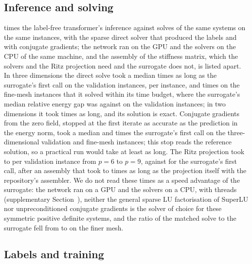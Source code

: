 \subsection{Inference and solving}\label{sec:cost:inference}



 times the label-free transformer's inference against solves of the same
systems on the same instances, with the sparse direct solver that produced the labels and
with conjugate gradients; the network ran on the GPU and the solvers on the CPU of the same
machine, and the assembly of the stiffness matrix, which the solvers and the Ritz projection
need and the surrogate does not, is listed apart. In three dimensions the direct solve took
a median \numCostThreeValDirectRatio{} times as long as the surrogate's first call on the
validation instances, per instance, and \numCostThreeFineDirectRatio{} times on the
\numCostFineDirectSolved{} fine-mesh instances that it solved within its time budget, where
the surrogate's median relative energy gap was \numCostThreeFineGap{} against
\numCostThreeValGap{} on the validation instances; in two dimensions it took
\numCostTwoDirectRatio{} times as long, and its solution is exact. Conjugate gradients from
the zero field, stopped at the first iterate as accurate as the prediction in the energy
norm, took a median \numCostThreeValMatchRatio{} and \numCostThreeFineMatchRatio{} times the
surrogate's first call on the three-dimensional validation and fine-mesh instances; this
stop reads the reference solution, so a practical run would take at least as long. The Ritz
projection took \numCostRitzValMin{} to \numCostRitzValMax{} per validation instance from
$p=6$ to $p=9$, against \numCostSurrVal{} for the surrogate's first call, after an assembly
that took \numCostAsmOverRitzMin{} to \numCostAsmOverRitzMax{} times as long as the
projection itself with the repository's assembler. We do not read these times as a speed
advantage of the surrogate: the network ran on a GPU and the solvers on a CPU, with
\numCostThreads{} threads (supplementary Section~\SuppTiming{}), neither the general sparse
LU factorisation of SuperLU nor unpreconditioned conjugate gradients is the solver of choice
for these symmetric positive definite systems, and the ratio of the matched solve to the
surrogate fell from \numCostThreeValMatchRatio{} to \numCostThreeFineMatchRatio{} on the
finer mesh.

\subsection{Labels and training}\label{sec:cost:labels}

